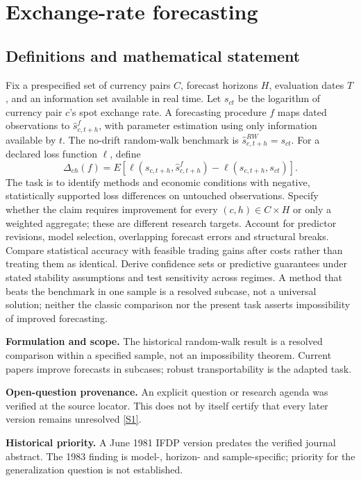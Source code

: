 \documentclass[11pt]{article}
\newcommand{\sref}[2]{\hyperlink{source:#1:#2}{[S#2]}}
\begin{document}
\section*{Exchange-rate forecasting}\label{30007612}
\subsection{Definitions and mathematical statement}
Fix a prespecified set of currency pairs \(C\), forecast horizons \(H\), evaluation dates \(T\), and an information set available in real time. Let \(s_{ct}\) be the logarithm of currency pair \(c\)'s spot exchange rate. A forecasting procedure \(f\) maps dated observations to \(\widehat s^f_{c,t+h}\), with parameter estimation using only information available by \(t\). The no-drift random-walk benchmark is \(\widehat s^{RW}_{c,t+h}=s_{ct}\). For a declared loss function \(\ell\), define
\[\Delta_{ch}(f)=E[\ell(s_{c,t+h},\widehat s^f_{c,t+h})-\ell(s_{c,t+h},s_{ct})].\]
The task is to identify methods and economic conditions with negative, statistically supported loss differences on untouched observations. Specify whether the claim requires improvement for every \((c,h)\in C\times H\) or only a weighted aggregate; these are different research targets. Account for predictor revisions, model selection, overlapping forecast errors and structural breaks. Compare statistical accuracy with feasible trading gains after costs rather than treating them as identical. Derive confidence sets or predictive guarantees under stated stability assumptions and test sensitivity across regimes. A method that beats the benchmark in one sample is a resolved subcase, not a universal solution; neither the classic comparison nor the present task asserts impossibility of improved forecasting.

\par\textbf{Formulation and scope.} The historical random-walk result is a resolved comparison within a specified sample, not an impossibility theorem. Current papers improve forecasts in subcases; robust transportability is the adapted task.

\par\textbf{Open-question provenance.} An explicit question or research agenda was verified at the source locator. This does not by itself certify that every later version remains unresolved \sref{30007612}{1}.

\par\textbf{Historical priority.} A June 1981 IFDP version predates the verified journal abstract. The 1983 finding is model-, horizon- and sample-specific; priority for the generalization question is not established.
\end{document}
